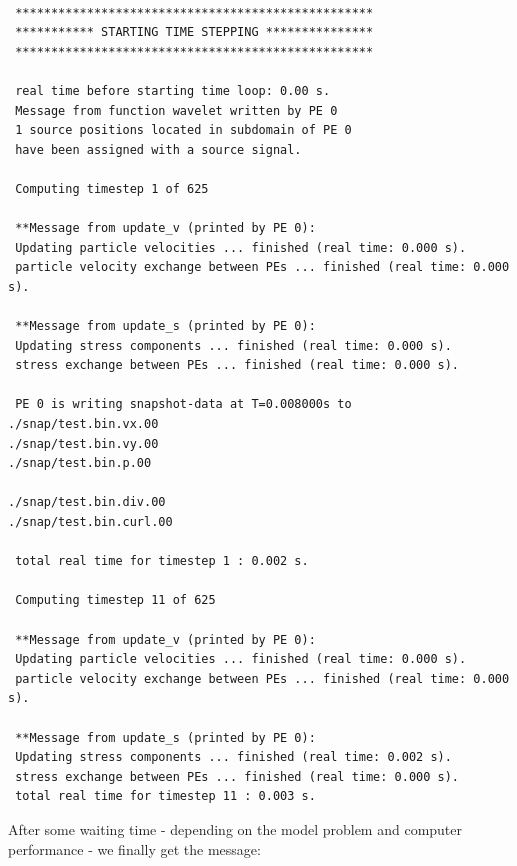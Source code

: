 \begin{verbatim} 

 **************************************************
 *********** STARTING TIME STEPPING ***************
 **************************************************

 real time before starting time loop: 0.00 s.
 Message from function wavelet written by PE 0
 1 source positions located in subdomain of PE 0
 have been assigned with a source signal.

 Computing timestep 1 of 625

 **Message from update_v (printed by PE 0):
 Updating particle velocities ... finished (real time: 0.000 s).
 particle velocity exchange between PEs ... finished (real time: 0.000 s).

 **Message from update_s (printed by PE 0):
 Updating stress components ... finished (real time: 0.000 s).
 stress exchange between PEs ... finished (real time: 0.000 s).

 PE 0 is writing snapshot-data at T=0.008000s to
./snap/test.bin.vx.00
./snap/test.bin.vy.00
./snap/test.bin.p.00

./snap/test.bin.div.00
./snap/test.bin.curl.00

 total real time for timestep 1 : 0.002 s.

 Computing timestep 11 of 625

 **Message from update_v (printed by PE 0):
 Updating particle velocities ... finished (real time: 0.000 s).
 particle velocity exchange between PEs ... finished (real time: 0.000 s).

 **Message from update_s (printed by PE 0):
 Updating stress components ... finished (real time: 0.002 s).
 stress exchange between PEs ... finished (real time: 0.000 s).
 total real time for timestep 11 : 0.003 s.
\end{verbatim}

After some waiting time - depending on the model problem and computer performance - we finally get the message:

